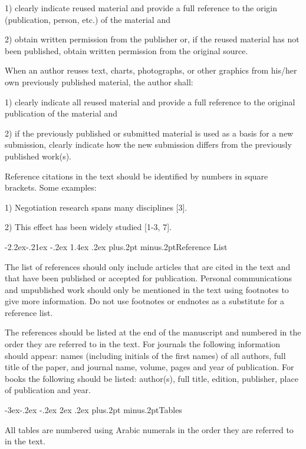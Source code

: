 \documentclass[twoside]{article}
\makeatletter
\def\subsection{\@startsection{subsection}{2}{\z@}%
 {-3ex\@plus -.2ex \@minus -.2ex}%
 {2ex \@plus.2ex}%
{\normalfont\normalsize\protect\baselineskip=12.5pt plus.2pt minus.2pt\bfseries}}
\def\subsubsection{\@startsection{subsubsection}{3}{\z@}%
 {-2.2ex\@plus -.21ex \@minus -.2ex}%
 {1.4ex \@plus.2ex}
{\normalfont\normalsize\protect\baselineskip=12pt plus.2pt minus.2pt\sl}}
\makeatother
\begin{document}
\begin{multicols}{2}
1) clearly indicate reused material and provide a full reference to the origin (publication, person, etc.) of the material and

2) obtain written permission from the publisher or, if the reused material has not been published, obtain written permission from the original source.

When an author reuses text, charts, photographs, or other graphics from his/her own previously published material, the author shall:

1) clearly indicate all reused material and provide a full reference to the original publication of the material and

2) if the previously published or submitted material is used as a basis for a new submission, clearly indicate how the new submission differs from the previously published work(s).

Reference citations in the text should be identified by numbers in square
brackets. Some examples:

1) Negotiation research spans many disciplines [3].

2) This effect has been widely studied [1-3, 7].

\subsubsection{Reference List}

The list of references should only include articles that are cited in the text and that have been published or accepted for publication. Personal communications and unpublished work should only be mentioned in the text using footnotes to give more information. Do not use footnotes or endnotes as a substitute for a reference list.

The references should be listed at the end of the manuscript and numbered in the order they are referred to in the text. For journals the following information should appear: names (including initials of the first names) of all authors, full title of the paper, and journal name, volume, pages and year of publication. For books the following should be listed: author(s), full title, edition, publisher, place of publication and year.

\subsection{Tables}

All tables are numbered using Arabic numerals in the order they are referred to in the text.


\end{multicols}
\end{document}
